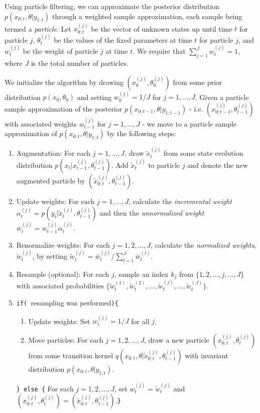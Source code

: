 \documentclass{article}
\begin{document}
Using particle filtering, we can approximate the posterior distribution $p(x_{0:t},\theta|y_{1:t})$ through a weighted sample approximation, each sample being termed a \emph{particle}. Let $x^{(j)}_{0:t}$ be the vector of unknown states up until time $t$ for particle $j$, $\theta^{(j)}_t$ be the values of the fixed parameters at time $t$ for particle $j$, and $w^{(j)}_t$ be the weight of particle $j$ at time $t$. We require that $\sum_{j=1}^J w^{(j)}_t = 1$, where $J$ is the total number of particles.

We initialize the algorithm by drawing $\left(x^{(j)}_0, \theta^{(j)}_0\right)$ from some prior distribution $p(x_0,\theta_0)$ and setting $w^{(j)}_0 = 1 / J$ for $j = 1,\ldots,J$. Given a particle sample approximation of the posterior $p(x_{0:t-1},\theta|y_{1:t-1})$ - i.e. $\left(x^{(j)}_{0:t-1},\theta^{(j)}_{t-1}\right)$ with associated weights $w^{(j)}_{t-1}$ for $j=1,\ldots,J$ - we move to a particle sample approximation of $p(x_{0:t},\theta|y_{1:t})$ by the following steps:

\begin{enumerate}
\item Augmentation: For each $j = 1,\ldots,J$, draw $\tilde{x}^{(j)}_t$ from some state evolution distribution $p\left(x_t|x^{(j)}_{t-1},\theta^{(j)}_{t-1}\right)$. Add $\tilde{x}^{(j)}_t$ to particle $j$ and denote the new augmented particle by $\left(\tilde{x}^{(j)}_{0:t},\theta^{(j)}_{t-1}\right)$.
\item Update weights: For each $j = 1,\ldots,J$, calculate the \emph{incremental weight} $\alpha^{(j)}_t = p\left(y_t|\tilde{x}^{(j)}_t,\theta^{(j)}_{t-1}\right)$ and then the \emph{unnormalized weight} $\bar{w}^{(j)}_t = w^{(j)}_{t-1}\alpha^{(j)}_t$.
\item Renormalize weights: For each $j = 1,2,\ldots,J$, calculate the \emph{normalized weights}, $\tilde{w}^{(j)}_t$, by setting $\tilde{w}^{(j)}_t = \bar{w}^{(j)}_t / \sum_{l=1}^J \bar{w}^{(l)}_t$.
\item Resample (optional): For each $j$, sample an index $k_j$ from $\{1,2,\ldots,j,\ldots,J\}$ with associated probabilities $\{\tilde{w}^{(1)}_t,\tilde{w}^{(2)}_t,\ldots,\tilde{w}^{(j)}_t,\ldots,\tilde{w}^{(J)}_t\}$.
\item {\tt if( }resampling was performed{\tt )\{} \\
\begin{enumerate}[label=\alph*.]
\item Update weights: Set $w^{(j)}_t = 1 / J$ for all $j$.
\item Move particles: For each $j = 1,2,\ldots,J$, draw a new particle $\left(x^{(j)}_{0:t},\theta^{(j)}_t\right)$ from some transition kernel $q\left(x_{0:t},\theta|\tilde{x}^{(j)}_{0:t},\theta^{(j)}_{t-1}\right)$ with invariant distribution $p(x_{0:t},\theta|y_{1:t})$.
\end{enumerate}
{\tt \} else \{} For each $j = 1,2,\ldots,J$, set $w^{(j)}_t = \tilde{w}^{(j)}_t$ and $\left(x^{(j)}_{0:t},\theta^{(j)}_t\right) = \left(\tilde{x}^{(j)}_{0:t},\theta^{(j)}_{t-1}\right)$.{\tt\}}
\end{enumerate}
\end{document}
